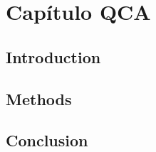 \documentclass[12pt,openright,oneside,a4paper,english,sumario=tradicional]{gpsabntex}
\numberwithin{listing}{chapter}
\begin{document}
\tableofcontents*
\thispagestyle{empty}

\mainmatter
\cleardoublepage
\pagestyle{plain} %
\renewcommand{\thepage}{\arabic{page}}  %


\chapter{Capítulo QCA}
\label{sec:org3d46169}

\section{Introduction}
\label{sec:org40bf5e0}

\section{Methods}
\label{sec:orgea61dd0}

\section{Conclusion}
\label{sec:org677543a}
\appendix
\end{document}
